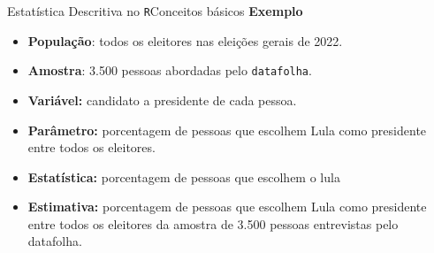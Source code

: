 \documentclass[
  10pt,
  ignorenonframetext,
]{beamer}
\providecommand{\tightlist}{%
  \setlength{\itemsep}{0pt}\setlength{\parskip}{0pt}}\usepackage{longtable,booktabs,array}
\begin{document}
\begin{frame}[fragile]{Estatística Descritiva no
\texttt{R}\newline Conceitos básicos}
\protect\hypertarget{estatuxedstica-descritiva-no-rconceitos-buxe1sicos-1}{}
\textbf{Exemplo}

\begin{itemize}
\tightlist
\item
  \textbf{População}: todos os eleitores nas eleições gerais de 2022.
\item
  \textbf{Amostra}: 3.500 pessoas abordadas pelo \texttt{datafolha}.
\item
  \textbf{Variável:} candidato a presidente de cada pessoa.
\item
  \textbf{Parâmetro:} porcentagem de pessoas que escolhem Lula como
  presidente entre todos os eleitores.
\item
  \textbf{Estatística:} porcentagem de pessoas que escolhem o lula
\item
  \textbf{Estimativa:} porcentagem de pessoas que escolhem Lula como
  presidente entre todos os eleitores da amostra de 3.500 pessoas
  entrevistas pelo datafolha.
\end{itemize}
\end{frame}
\end{document}
